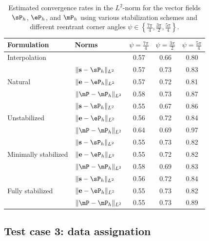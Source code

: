 \begin{table}[h!]
	\centering
	\caption{Estimated convergence rates in the $ L^2 $-norm for the vector fields $ \sP_h $, $ \eP_h $, and $ \mP_h $ using various stabilization schemes and different reentrant corner angles $ \psi \in \left\{ \frac{7\pi}{4}, \frac{3\pi}{2}, \frac{5\pi}{4} \right\} $.}
	\begin{tabular}{l l c c c}
		\toprule
		Formulation & Norms & $\psi = \frac{7\pi}{4}$ & $\psi = \frac{3\pi}{2}$ & $\psi = \frac{5\pi}{4}$ \\ [2pt]
		\hline
		Interpolation                   &  & 0.57 & 0.66 & 0.80 \\
		\hline  
		\multirow{3}{*}{Natural}    & $\|\mathbf{s}-\sP_{h}\|_{L^{2}}$ & 0.57 & 0.73 & 0.83  \\
		                                 & $\|\mathbf{e}-\eP_{h}\|_{L^{2}}$ & 0.57 & 0.72 & 0.81 \\
		                                 & $\|\mP-\mP_{h}\|_{L^{2}}$ & 0.58 & 0.73 & 0.87 \\
		\hline
		\multirow{3}{*}{Unstabilized}    & $\|\mathbf{s}-\sP_{h}\|_{L^{2}}$ & 0.55 & 0.67 & 0.86 \\
		                                 & $\|\mathbf{e}-\eP_{h}\|_{L^{2}}$ & 0.56 & 0.72 & 0.84 \\
		                                 & $\|\mP-\mP_{h}\|_{L^{2}}$ & 0.64 & 0.69 & 0.97 \\
		\hline
				\multirow{3}{*}{Minimally stabilized} & $\|\mathbf{s}-\sP_{h}\|_{L^{2}}$ & 0.55 & 0.73 & 0.82 \\
		& $\|\mathbf{e}-\eP_{h}\|_{L^{2}}$ & 0.55 & 0.72 & 0.82 \\
		& $\|\mP-\mP_{h}\|_{L^{2}}$ & 0.58 & 0.69 & 0.83 \\
		\hline
		\multirow{3}{*}{Fully stabilized} & $\|\mathbf{s}-\sP_{h}\|_{L^{2}}$ & 0.56 & 0.72 & 0.84 \\
		& $\|\mathbf{e}-\eP_{h}\|_{L^{2}}$ & 0.55 & 0.73 & 0.82 \\
		& $\|\mP-\mP_{h}\|_{L^{2}}$ & 0.55 & 0.73 & 0.89 \\
		\bottomrule
	\end{tabular}
	\label{tab:vector_errors}
\end{table}


\newpage
\subsection{Test case 3: data assignation}

